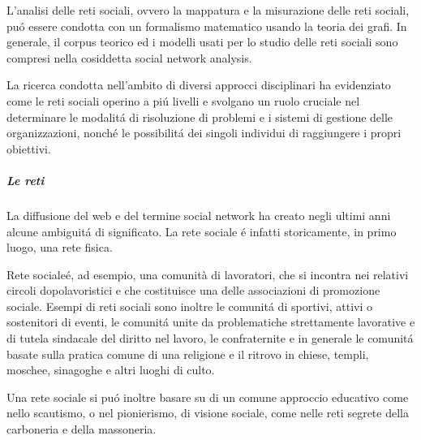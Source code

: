 L'analisi delle reti sociali, ovvero la mappatura e la misurazione delle reti sociali, pu\'o essere condotta con un formalismo matematico usando la teoria dei grafi. In generale, il corpus teorico ed i modelli usati per lo studio delle reti sociali sono compresi nella cosiddetta social network analysis.

La ricerca condotta nell'ambito di diversi approcci disciplinari ha evidenziato come le reti sociali operino a pi\'u livelli e svolgano un ruolo cruciale nel determinare le modalit\'a di risoluzione di problemi e i sistemi di gestione delle organizzazioni, nonch\'e le possibilit\'a dei singoli individui di raggiungere i propri obiettivi.

\subparagraph{Le reti}
La diffusione del web e del termine social network ha creato negli ultimi anni alcune ambiguit\'a di significato. La rete sociale \'e infatti storicamente, in primo luogo, una rete fisica.

Rete sociale\'e, ad esempio, una comunità di lavoratori, che si incontra nei relativi circoli dopolavoristici e che costituisce una delle associazioni di promozione sociale. Esempi di reti sociali sono inoltre le comunit\'a di sportivi, attivi o sostenitori di eventi, le comunit\'a unite da problematiche strettamente lavorative e di tutela sindacale del diritto nel lavoro, le confraternite e in generale le comunit\'a basate sulla pratica comune di una religione e il ritrovo in chiese, templi, moschee, sinagoghe e altri luoghi di culto.

Una rete sociale si pu\'o inoltre basare su di un comune approccio educativo come nello scautismo, o nel pionierismo, di visione sociale, come nelle reti segrete della carboneria e della massoneria.

